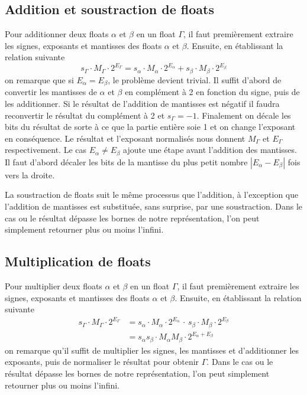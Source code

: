 \documentclass{article}
\begin{document}
\subsection{Addition et soustraction de floats}
Pour additionner deux floats $\alpha$ et $\beta$ en un float $\Gamma$, il faut premièrement extraire les signes, exposants et mantisses des floats $\alpha$ et $\beta$. Ensuite, en établissant la relation suivante
$$s_{\Gamma}\cdot M_{\Gamma} \cdot 2^{E_{\Gamma}} = s_{\alpha}\cdot M_{\alpha} \cdot 2^{E_{\alpha}}+s_{\beta}\cdot M_{\beta} \cdot 2^{E_{\beta}}$$
on remarque que si $E_{\alpha} = E_{\beta}$, le problème devient trivial. Il suffit d'abord de convertir les mantisses de $\alpha$ et $\beta$ en complément à 2 en fonction du signe, puis de les additionner. Si le résultat de l'addition de mantisses est négatif il faudra reconvertir le résultat du complément à 2 et $s_{\Gamma} = -1$. Finalement on décale les bits du résultat de sorte à ce que la partie entière soie 1 et on change l'exposant en conséquence. Le résultat et l'exposant normalisés nous donnent $M_{\Gamma}$ et $E_{\Gamma}$ respectivement. Le cas $E_{\alpha} \not= E_{\beta}$ ajoute une étape avant l'addition des mantisses. Il faut d'abord décaler les bits de la mantisse du plus petit nombre $|E_{\alpha}-E_{\beta}|$ fois vers la droite.

La soustraction de floats suit le même processus que l'addition, à l'exception que l'addition de mantisses est substituée, sans surprise, par une soustraction. Dans le cas ou le résultat dépasse les bornes de notre représentation, l'on peut simplement retourner plus ou moins l'infini.
\subsection{Multiplication de floats}
Pour multiplier deux floats $\alpha$ et $\beta$ en un float $\Gamma$, il faut premièrement extraire les signes, exposants et mantisses des floats $\alpha$ et $\beta$. Ensuite, en établissant la relation suivante
\begin{align*}
    s_{\Gamma}\cdot M_{\Gamma} \cdot 2^{E_{\Gamma}} &= s_{\alpha}\cdot M_{\alpha} \cdot 2^{E_{\alpha}}\,\cdot\,s_{\beta}\cdot M_{\beta} \cdot 2^{E_{\beta}}\\
    &= s_{\alpha}s_{\beta}\cdot M_{\alpha}M_{\beta}\cdot 2^{E_{\alpha}+E_{\beta}}
\end{align*}
on remarque qu'il suffit de multiplier les signes, les mantisses et d'additionner les exposants, puis de normaliser le résultat pour obtenir $\Gamma$. Dans le cas ou le résultat dépasse les bornes de notre représentation, l'on peut simplement retourner plus ou moins l'infini.
\end{document}
